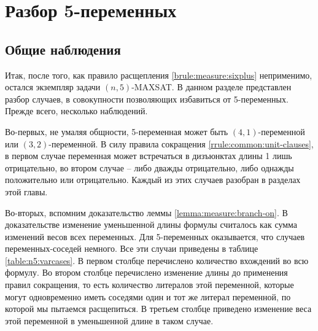 
\section{Разбор 5-переменных}
\label{sec:n5}

\subsection{Общие наблюдения}
\label{subsec:n5:observations}

Итак, после того, как правило расщепления \ref{brule:measure:sixplus} неприменимо, остался экземпляр задачи $(n,5)$-MAXSAT. В данном разделе представлен разбор случаев, в совокупности позволяющих избавиться от 5-переменных. Прежде всего, несколько наблюдений.

Во-первых, не умаляя общности, 5-переменная может быть $(4,1)$-переменной или $(3,2)$-переменной. В силу правила сокращения \ref{rrule:common:unit-clauses}, в первом случае переменная может встречаться в дизъюнктах длины 1 лишь отрицательно, во втором случае -- либо дважды отрицательно, либо однажды положительно или отрицательно. Каждый из этих случаев разобран в разделах этой главы.

Во-вторых, вспомним доказательство леммы \ref{lemma:measure:branch-on}. В доказательстве изменение уменьшенной длины формулы считалось как сумма изменений весов всех переменных. Для 5-переменных оказывается, что случаев переменных-соседей немного. Все эти случаи приведены в таблице \ref{table:n5:varcases}. В первом столбце перечислено количество вхождений во всю формулу. Во втором столбце перечислено изменение длины до применения правил сокращения, то есть количество литералов этой переменной, которые могут одновременно иметь соседями один и тот же литерал переменной, по которой мы пытаемся расщепиться. В третьем столбце приведено изменение веса этой переменной в уменьшенной длине в таком случае.

